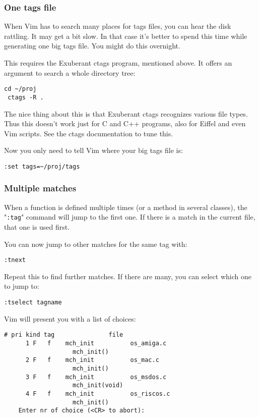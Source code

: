 \subsubsection{One tags file}
When Vim has to search many places for tags files, you can hear the disk rattling.
It may get a bit slow.
In that case it's better to spend this time while generating one big tags file.
You might do this overnight.

This requires the Exuberant ctags program, mentioned above.
It offers an argument to search a whole directory tree:

\begin{Verbatim}[samepage=true]
 cd ~/proj
 ctags -R .
\end{Verbatim}

The nice thing about this is that Exuberant ctags recognizes various file types.
Thus this doesn't work just for C and C++ programs, also for Eiffel and even Vim scripts.
See the ctags documentation to tune this.

Now you only need to tell Vim where your big tags file is:

\begin{Verbatim}[samepage=true]
 :set tags=~/proj/tags
\end{Verbatim}
\subsubsection{Multiple matches}
When a function is defined multiple times (or a method in several classes), the "\texttt{:tag}" command will jump to the first one.
If there is a match in the current file, that one is used first.

You can now jump to other matches for the same tag with:

\begin{Verbatim}[samepage=true]
 :tnext
\end{Verbatim}

Repeat this to find further matches.
If there are many, you can select which one to jump to:

\begin{Verbatim}[samepage=true]
 :tselect tagname
\end{Verbatim}

Vim will present you with a list of choices:

\begin{Verbatim}[samepage=true]
      # pri kind tag               file 
      1 F   f    mch_init          os_amiga.c 
                   mch_init() 
      2 F   f    mch_init          os_mac.c 
                   mch_init() 
      3 F   f    mch_init          os_msdos.c 
                   mch_init(void) 
      4 F   f    mch_init          os_riscos.c 
                   mch_init() 
    Enter nr of choice (<CR> to abort):  
\end{Verbatim}

